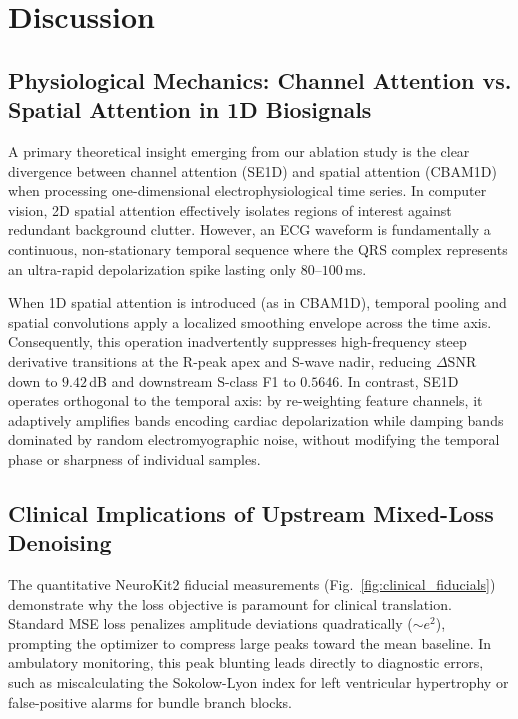 \section{Discussion}
\label{sec:discussion}

\subsection{Physiological Mechanics: Channel Attention vs. Spatial Attention in 1D Biosignals}
A primary theoretical insight emerging from our ablation study is the clear divergence between channel attention (SE1D) and spatial attention (CBAM1D) when processing one-dimensional electrophysiological time series. In computer vision, 2D spatial attention effectively isolates regions of interest against redundant background clutter. However, an ECG waveform is fundamentally a continuous, non-stationary temporal sequence where the QRS complex represents an ultra-rapid depolarization spike lasting only $80$--$100$\,ms.

When 1D spatial attention is introduced (as in CBAM1D), temporal pooling and spatial convolutions apply a localized smoothing envelope across the time axis. Consequently, this operation inadvertently suppresses high-frequency steep derivative transitions at the R-peak apex and S-wave nadir, reducing $\Delta\mathrm{SNR}$ down to $9.42$\,dB and downstream S-class F1 to $0.5646$. In contrast, SE1D operates orthogonal to the temporal axis: by re-weighting feature channels, it adaptively amplifies bands encoding cardiac depolarization while damping bands dominated by random electromyographic noise, without modifying the temporal phase or sharpness of individual samples.

\subsection{Clinical Implications of Upstream Mixed-Loss Denoising}
The quantitative NeuroKit2 fiducial measurements (Fig.~\ref{fig:clinical_fiducials}) demonstrate why the loss objective is paramount for clinical translation. Standard MSE loss penalizes amplitude deviations quadratically ($\sim e^2$), prompting the optimizer to compress large peaks toward the mean baseline. In ambulatory monitoring, this peak blunting leads directly to diagnostic errors, such as miscalculating the Sokolow-Lyon index for left ventricular hypertrophy or false-positive alarms for bundle branch blocks.

